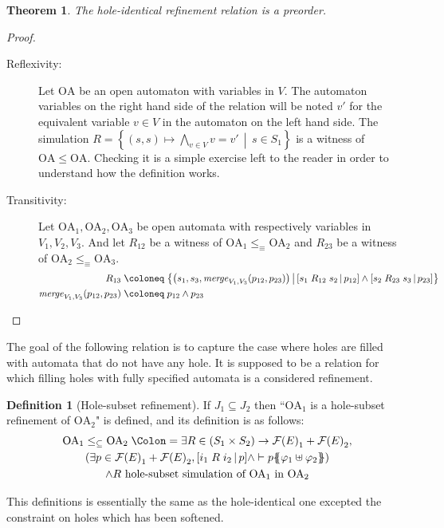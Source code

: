 \documentclass{article}
\theoremstyle{plain}
\newtheorem{thm}{Theorem}
\theoremstyle{definition}
\newtheorem{defi}{Definition}
\newcommand\nmm[1]{\(\displaystyle #1\)}
\newcommand\mpar[1]{{\left(#1\right)}}
\newcommand\mbrk[1]{{\left[#1\right]}}
\newcommand\mbrc[1]{{\left\{#1\right\}}}
\newcommand\psubst[1]{\mbrc{\!\!\mbrc{#1}\!\!}}
\newcommand\midbar{\,\middle|\,}
\newcommand\mset[2]{\mbrc{#1\midbar #2}}
\newcommand\prel[4]{\mbrk{#2\mathrel{#1}#3\midbar #4}}
\newcommand\defnotation{\DOTSB\;{\Colon=}\;}
\newcommand\defobject{\DOTSB\;{\coloneq}\;}
\newcommand\fformulas[1]{{\mathcal{F}\mpar{#1}}}
\begin{document}
\begin{thm} The hole-identical refinement relation is a preorder. \end{thm}
\begin{proof}
\begin{description}
\item[Reflexivity:] Let \(\mathrm{OA}\) be an open automaton with variables in \(V\).
	The automaton variables on the right hand side of the relation will be noted \(v'\) for the equivalent variable \(v \in V\) in the automaton on the left hand side.
	The simulation \nmm{R = \mset{\mpar{s, s} \mapsto \bigwedge_{v \in V} v = v'}{s \in S_1}} is a witness of \(\mathrm{OA} \leq \mathrm{OA}\).
	Checking it is a simple exercise left to the reader in order to understand how the definition works.
\item[Transitivity:] Let \(\mathrm{OA}_1, \mathrm{OA}_2, \mathrm{OA}_3\) be open automata with respectively variables in \(V_1, V_2, V_3\).
	And let \(R_{12}\) be a witness of \(\mathrm{OA}_1 \leq_\equiv \mathrm{OA}_2\) and \(R_{23}\) be a witness of \(\mathrm{OA}_2 \leq_\equiv \mathrm{OA}_3\).
	\begin{align*}
		R_{13} \defobject & \mset{\mpar{s_1, s_3, \mathit{merge}_{V_1,V_3}\mpar{p_{12}, p_{23}}}}{\prel{R_{12}}{s_1}{s_2}{p_{12}} \wedge \prel{R_{23}}{s_2}{s_3}{p_{23}}} \\
		\mathit{merge}_{V_1,V_3}\mpar{p_{12}, p_{23}} \defobject & p_{12} \wedge p_{23} %
	\end{align*}
\end{description}
\end{proof}

The goal of the following relation is to capture the case where holes are filled with automata that do not have any hole.
It is supposed to be a relation for which filling holes with fully specified automata is a considered refinement.
\begin{defi}[Hole-subset refinement]
If \(J_1 \subseteq J_2\) then ``\(\mathrm{OA}_1\) is a hole-subset refinement of \(\mathrm{OA}_2\)" is defined, and its definition is as follows:
\begin{multline*}
	\mathrm{OA}_1 \leq_\subseteq \mathrm{OA}_2 \defnotation \exists R \in \mpar{S_1 \times S_2} \to \fformulas{E}_1 + \fformulas{E}_2, \\
	\mpar{\exists p \in \fformulas{E}_1 + \fformulas{E}_2, \prel{R}{i_1}{i_2}{p} \wedge \vdash p\psubst{\varphi_1 \uplus \varphi_2}} \\
	\wedge R \text{ hole-subset simulation of } \mathrm{OA}_1 \text{ in } \mathrm{OA}_2
\end{multline*}
\end{defi}
This definitions is essentially the same as the hole-identical one excepted the constraint on holes which has been softened.
\end{document}

